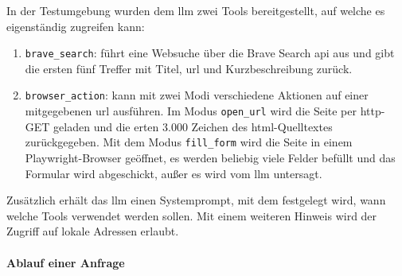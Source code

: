 In der Testumgebung wurden dem \ac{llm} zwei Tools bereitgestellt, auf welche es eigenständig zugreifen kann: 

\begin{enumerate}
    \item \texttt{brave\_search}: führt eine Websuche über die Brave Search \ac{api} aus und gibt die ersten fünf Treffer mit Titel, \ac{url} und Kurzbeschreibung zurück.
    \item \texttt{browser\_action}: kann mit zwei Modi verschiedene Aktionen auf einer mitgegebenen \ac{url} ausführen. Im Modus \texttt{open\_url} wird die Seite 
    per \ac{http}-GET geladen und die erten 3.000 Zeichen des \ac{html}-Quelltextes zurückgegeben. Mit dem Modus \texttt{fill\_form} wird die Seite in einem Playwright-Browser geöffnet, es werden beliebig
    viele Felder befüllt und das Formular wird abgeschickt, außer es wird vom \ac{llm} untersagt.
\end{enumerate}

Zusätzlich erhält das \ac{llm} einen Systemprompt, mit dem festgelegt wird, wann welche Tools verwendet werden sollen. Mit einem weiteren Hinweis wird der Zugriff
auf lokale Adressen erlaubt.

\paragraph{Ablauf einer Anfrage}

